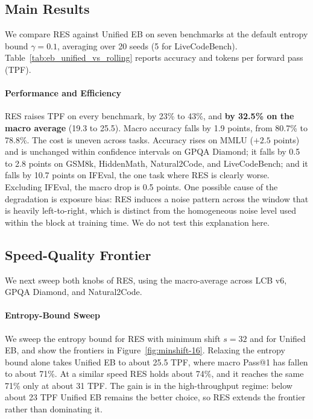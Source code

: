 
\subsection{Main Results}
We compare RES against Unified EB on seven benchmarks at the default entropy bound $\gamma = 0.1$, averaging over 20 seeds (5 for LiveCodeBench).
Table~\ref{tab:eb_unified_vs_rolling} reports accuracy and tokens per forward pass (TPF).



\paragraph{Performance and Efficiency}
RES raises TPF on every benchmark, by 23\% to 43\%, and \textbf{by 32.5\% on the macro average} (19.3 to 25.5).
Macro accuracy falls by 1.9 points, from 80.7\% to 78.8\%.
The cost is uneven across tasks.
Accuracy rises on MMLU ($+2.5$ points) and is unchanged within confidence intervals on GPQA Diamond; it falls by 0.5 to 2.8 points on GSM8k, HiddenMath, Natural2Code, and LiveCodeBench; and it falls by 10.7 points on IFEval, the one task where RES is clearly worse.
Excluding IFEval, the macro drop is 0.5 points.
One possible cause of the degradation is exposure bias: RES induces a noise pattern across the window that is heavily left-to-right, which is distinct from the homogeneous noise level used within the block at training time.
We do not test this explanation here.

\subsection{Speed-Quality Frontier}
We next sweep both knobs of RES, using the macro-average across LCB v6, GPQA Diamond, and Natural2Code.



\paragraph{Entropy-Bound Sweep}
We sweep the entropy bound for RES with minimum shift $s=32$ and for Unified EB, and show the frontiers in Figure~\ref{fig:minshift-16}.
Relaxing the entropy bound alone takes Unified EB to about 25.5 TPF, where macro Pass@1 has fallen to about 71\%.
At a similar speed RES holds about 74\%, and it reaches the same 71\% only at about 31 TPF.
The gain is in the high-throughput regime: below about 23 TPF Unified EB remains the better choice, so RES extends the frontier rather than dominating it.

